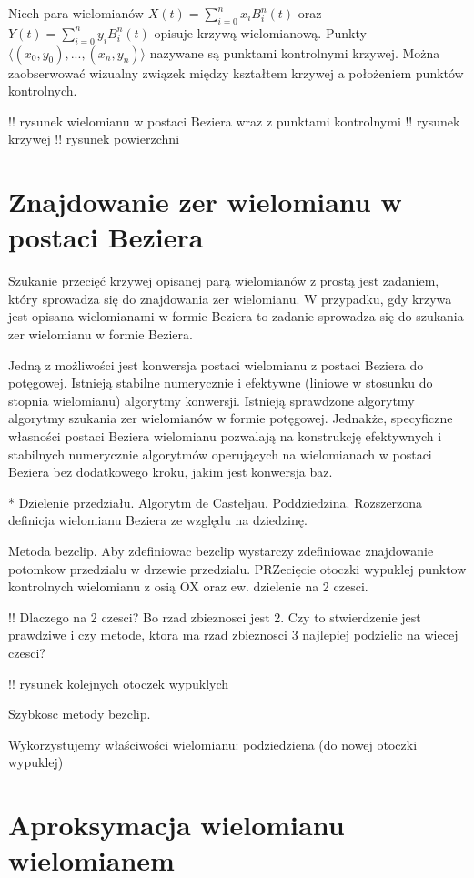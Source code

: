\documentclass[11pt,a4paper,oneside]{report}
\begin{document}
Niech para wielomianów $X(t) = \sum^n_{i=0}x_i B^n_i(t)$ oraz $Y(t) = \sum^n_{i=0}y_i B^n_i(t)$ opisuje krzywą wielomianową. Punkty $\langle (x_0,y_0), ..., (x_n, y_n) \rangle$ nazywane są punktami kontrolnymi krzywej. Można zaobserwować wizualny związek między kształtem krzywej a położeniem punktów kontrolnych.

!! rysunek wielomianu w postaci Beziera wraz z punktami kontrolnymi
!! rysunek krzywej
!! rysunek powierzchni

\section{Znajdowanie zer wielomianu w postaci Beziera}

Szukanie przecięć krzywej opisanej parą wielomianów z prostą jest zadaniem, który sprowadza się do znajdowania zer wielomianu. W przypadku, gdy krzywa jest opisana wielomianami w formie Beziera to zadanie sprowadza się do szukania zer wielomianu w formie Beziera.

Jedną z możliwości jest konwersja postaci wielomianu z postaci Beziera do potęgowej. Istnieją stabilne numerycznie i efektywne (liniowe w stosunku do stopnia wielomianu) algorytmy konwersji. Istnieją sprawdzone algorytmy algorytmy szukania zer wielomianów w formie potęgowej. Jednakże, specyficzne własności postaci Beziera wielomianu pozwalają na konstrukcję efektywnych i stabilnych numerycznie algorytmów operujących na wielomianach w postaci Beziera bez dodatkowego kroku, jakim jest konwersja baz.

* Dzielenie przedziału. Algorytm de Casteljau. Poddziedzina. Rozszerzona definicja wielomianu Beziera ze względu na dziedzinę.

Metoda bezclip. Aby zdefiniowac bezclip wystarczy zdefiniowac znajdowanie potomkow przedzialu w drzewie przedzialu. PRZecięcie otoczki wypuklej punktow kontrolnych wielomianu z osią OX oraz ew. dzielenie na 2 czesci.

!! Dlaczego na 2 czesci? Bo rzad zbieznosci jest 2. Czy to stwierdzenie jest prawdziwe i czy metode, ktora ma rzad zbieznosci 3 najlepiej podzielic na wiecej czesci?

!! rysunek kolejnych otoczek wypuklych

Szybkosc metody bezclip.

Wykorzystujemy właściwości wielomianu: podziedziena (do nowej otoczki wypuklej)

\section{Aproksymacja wielomianu wielomianem}
\end{document}
